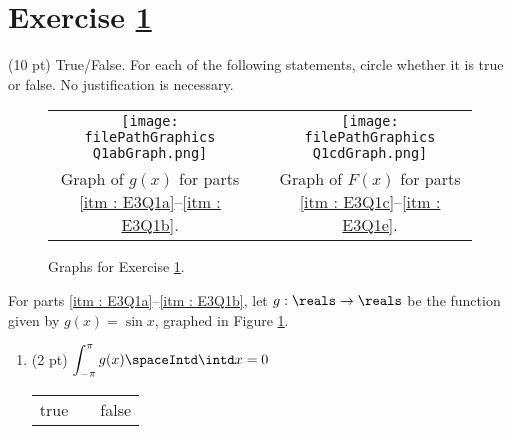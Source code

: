 %
%
%
%


\section{Exercise \ref{sec : Math112 Spring2022 Exam3 Q1}}
\label{sec : Math112 Spring2022 Exam3 Q1}

(10 pt) True/False. For each of the following statements, circle whether it is true or false. No justification is necessary.
\begin{figure}[t]
\centering
\begin{tabular}{*{3}{c}}
\texttt{[image: \\filePathGraphics Q1abGraph.png]}
&
\hspace{0.5in}
&
\texttt{[image: \\filePathGraphics Q1cdGraph.png]}
\\
Graph of $g(x)$ for parts \ref{itm : E3Q1a}--\ref{itm : E3Q1b}.
&
&
Graph of $F(x)$ for parts \ref{itm : E3Q1c}--\ref{itm : E3Q1e}.
\end{tabular}
\caption{Graphs for Exercise \ref{sec : Math112 Spring2022 Exam3 Q1}.}%
\label{fig : E3Q1 Graphs}%
\end{figure}

\vspace{0.25in}

For parts \ref{itm : E3Q1a}--\ref{itm : E3Q1b}, let $g : \reals \rightarrow \reals$ be the function given by $g(x) = \sin x$, graphed in Figure \ref{fig : E3Q1 Graphs}.

\begin{enumerate}[label=(\alph*)]
\item\label{itm : E3Q1a} (2 pt) $\displaystyle\int_{-\pi}^{\pi} g(x) \spaceIntd \intd x = 0$
\begin{center}
\begin{tabular}{c c c}
true	&	\hspace{1in}	&	false
\end{tabular}
\end{center}
\end{enumerate}




